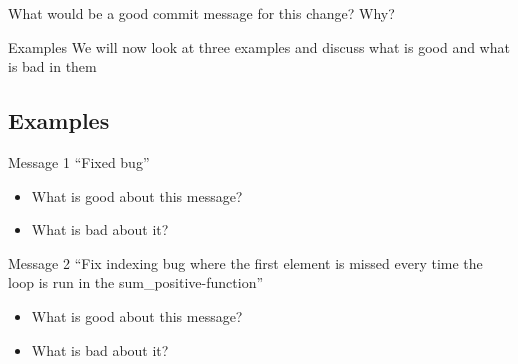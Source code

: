 \begin{frame}
\begin{question}
What would be a good commit message for this change? Why? %
\end{question}    
\end{frame}

\begin{frame}
\begin{block}{Examples}
    We will now look at three examples and discuss what is good and what is bad in them
\end{block}
\end{frame}

\subsection{Examples}
\begin{frame}
\begin{block}{Message 1}
    \enquote{Fixed bug}
\end{block}

\begin{question}
\begin{itemize}
    \pause
    \item What is good about this message?
    \pause
    \item What is bad about it?
\end{itemize}
\end{question}
    
\end{frame}

\begin{frame}
\begin{block}{Message 2}
    \enquote{Fix indexing bug where the first element is missed every time the loop is run in the sum\_positive-function}
\end{block}

\begin{question}
\begin{itemize}
    \pause
    \item What is good about this message?
    \pause
    \item What is bad about it?
\end{itemize}
\end{question}
    
\end{frame}


